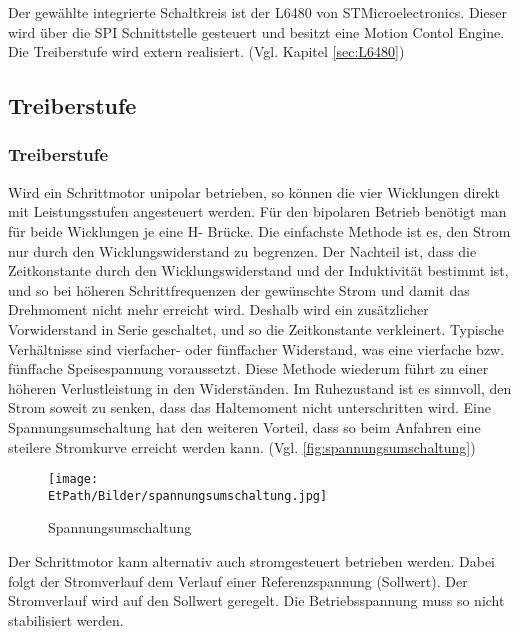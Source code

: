         Der gewählte integrierte Schaltkreis ist der L6480 von STMicroelectronics. Dieser wird über die SPI Schnittstelle gesteuert und besitzt eine Motion Contol Engine. Die Treiberstufe wird extern realisiert. (Vgl. Kapitel \ref{sec:L6480}) 
        
    \ifSTANDALONE
    \subsection{Treiberstufe}
    \fi
    \ifEMBED
    \subsubsection{Treiberstufe}
    \fi 
    	Wird ein Schrittmotor unipolar betrieben, so können die vier Wicklungen direkt mit Leistungsstufen angesteuert werden. Für den bipolaren Betrieb benötigt man für beide Wicklungen je eine H- Brücke. Die einfachste Methode ist es, den Strom nur durch den Wicklungswiderstand zu begrenzen. Der Nachteil ist, dass die Zeitkonstante durch den Wicklungswiderstand und der Induktivität bestimmt ist, und so bei höheren Schrittfrequenzen der gewünschte Strom und damit das Drehmoment nicht mehr erreicht wird. Deshalb wird ein zusätzlicher Vorwiderstand in Serie geschaltet, und so die Zeitkonstante verkleinert. Typische Verhältnisse sind vierfacher- oder fünffacher Widerstand, was eine vierfache bzw. fünffache Speisespannung voraussetzt. Diese Methode wiederum führt zu einer höheren Verlustleistung in den Widerständen. Im Ruhezustand ist es sinnvoll, den Strom soweit zu senken, dass das Haltemoment nicht unterschritten wird. Eine Spannungsumschaltung hat den weiteren Vorteil, dass so beim Anfahren eine steilere Stromkurve erreicht werden kann. (Vgl. \autoref{fig:spannungsumschaltung})
    	 \begin{figure}[h!]
    	 	\centering
    	 	\texttt{[image: \\EtPath/Bilder/spannungsumschaltung.jpg]}
    	 	\caption[Spannungsumschaltung]{Spannungsumschaltung \cite{AppNote:Stepper}}
    	 	\label{fig:spannungsumschaltung}
    	 \end{figure}
    	Der Schrittmotor kann alternativ auch stromgesteuert betrieben werden. Dabei folgt der Stromverlauf dem Verlauf einer Referenzspannung (Sollwert). Der Stromverlauf wird auf den Sollwert geregelt. Die Betriebsspannung muss so nicht stabilisiert werden. \label{stromgesteuert} 
	
	
		
